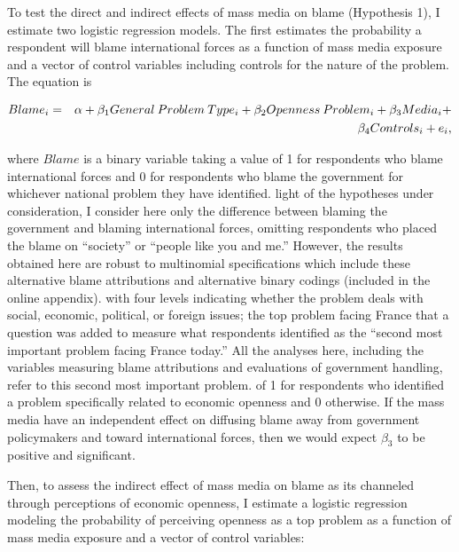 \documentclass[12pt]{report}
\begin{document}
To test the direct and indirect effects of mass media on blame (Hypothesis 1), I estimate two
logistic regression models. The first estimates the probability a respondent will blame
international forces as a function of mass media exposure and a vector of control variables
including controls for the nature of the problem. The equation is

\begin{eqnarray} Blame_{i} & = & \alpha+\beta_{1}General\: Problem\: Type_{i}+\beta_{2}Openness\:
Problem_{i}+\beta_{3}Media_{i}+ \notag \\ &  & \beta_{4}Controls_{i}+e_{i}, \end{eqnarray}

\noindent where $Blame$ is a binary variable taking a value of 1 for respondents who blame
international forces and 0 for respondents who blame the government for whichever national problem
they have identified.%
light of the hypotheses under consideration, I consider here only the difference between blaming the
government and blaming international forces, omitting respondents who placed the blame on
``society'' or ``people like you and me.'' However, the results obtained here are robust to
multinomial specifications which include these alternative blame attributions and alternative binary
codings (included in the online appendix).%
with four levels indicating whether the problem deals with social, economic, political, or foreign
issues;%
the top problem facing France that a question was added to measure what respondents identified as
the ``second most important problem facing France today.'' All the analyses here, including the
variables measuring blame attributions and evaluations of government handling, refer to this second
most important problem.%
of 1 for respondents who identified a problem specifically related to economic openness and 0
otherwise. If the mass media have an independent effect on diffusing blame away from government
policymakers and toward international forces, then we would expect $\beta_{3}$ to be positive and
significant.

Then, to assess the indirect effect of mass media on blame as its channeled through perceptions of
economic openness, I estimate a logistic regression modeling the probability of perceiving openness
as a top problem as a function of mass media exposure and a vector of control variables:
\end{document}
